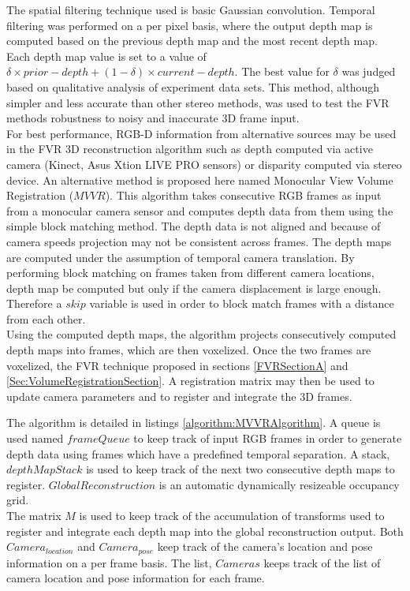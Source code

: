The spatial filtering technique used is basic Gaussian convolution. Temporal filtering was performed on a per pixel basis, where the output depth map is computed based on the previous depth map and the most recent depth map. Each depth map value is set to a value of $\delta \times prior-depth + (1-\delta) \times current-depth$. The best value for $\delta$ was judged based on qualitative analysis of experiment data sets. This method, although simpler and less accurate than other stereo methods, was used to test the FVR methods robustness to noisy and inaccurate 3D frame input. \\


For best performance, RGB-D information from alternative sources may be used in the FVR 3D reconstruction algorithm such as depth computed via active camera (Kinect, Asus Xtion LIVE PRO sensors) or disparity computed via stereo device. An alternative method is proposed here named Monocular View Volume Registration ($MVVR$). This algorithm takes consecutive RGB frames as input from a monocular camera sensor and computes depth data from them using the simple block matching method. The depth data is not aligned and because of camera speeds projection may not be consistent across frames. The depth maps are computed under the assumption of temporal camera translation. By performing block matching on frames taken from different camera locations, depth map be computed but only if the camera displacement is large enough. Therefore a $skip$ variable is used in order to block match frames with a distance from each other. \\

Using the computed depth maps, the algorithm projects consecutively computed depth maps into frames, which are then voxelized. Once the two frames are voxelized, the FVR technique proposed in sections \ref{FVRSectionA} and \ref{Sec:VolumeRegistrationSection}. A registration matrix may then be used to update camera parameters and to register and integrate the 3D frames. 

The algorithm is detailed in listings \ref{algorithm:MVVRAlgorithm}. A queue is used named $frameQueue$ to keep track of input RGB frames in order to generate depth data using frames which have a predefined temporal separation. A stack, $depthMapStack$ is used to keep track of the next two consecutive depth maps to register. $GlobalReconstruction$ is an automatic dynamically resizeable occupancy grid. \\

The matrix $M$ is used to keep track of the accumulation of transforms used to register and integrate each depth map into the global reconstruction output. Both $Camera_{location}$ and $Camera_{pose}$ keep track of the camera's location and pose information on a per frame basis. The list, $Cameras$ keeps track of the list of camera location and pose information for each frame.\\

